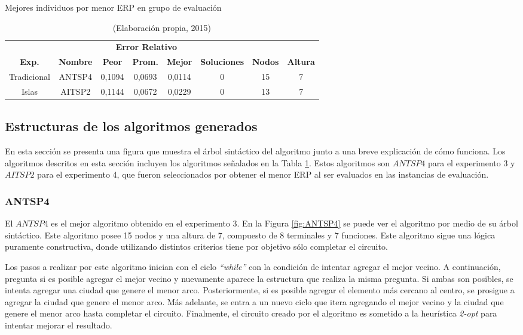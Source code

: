 \begin{table}[hbtp!]
\caption{Mejores individuos por menor ERP en grupo de evaluación}\label{tab:mejores_exp_erp_pvv}
\small
\centering
\begin{center}
\begin{tabular}{cc|ccc|ccc}
\multicolumn{2}{c}{{\textbf{ }}} & \multicolumn{3}{|c|}{{\textbf{Error Relativo}}} & \multicolumn{3}{c}{{\textbf{ }}} \\
{\textbf{Exp.}} & {\textbf{Nombre}} & {\textbf{Peor}} & {\textbf{Prom.}} & {\textbf{Mejor}} & {\textbf{Soluciones}} & {\textbf{Nodos}} & {\textbf{Altura}}\\ \hline
Tradicional & ANTSP4 & 0,1094 & 0,0693 & 0,0114 & 0 & 15 & 7 \\
Islas & AITSP2 & 0,1144 & 0,0672 & 0,0229 & 0 & 13 & 7 \\
\hline
\end{tabular}
\end{center}
\caption*{(Elaboración propia, 2015)}
\end{table}


\subsection{Estructuras de los algoritmos generados}

En esta sección se presenta una figura que muestra el árbol sintáctico del algoritmo junto a una breve explicación de cómo funciona. Los algoritmos descritos en esta sección incluyen los algoritmos señalados en la Tabla \ref{tab:mejores_exp_erp_pvv}. Estos algoritmos son $ANTSP4$ para el experimento 3 y $AITSP2$ para el experimento 4, que fueron seleccionados por obtener el menor ERP al ser evaluados en las instancias de evaluación.

\subsubsection{ANTSP4}

El $ANTSP4$ es el mejor algoritmo obtenido en el experimento 3. En la Figura \ref{fig:ANTSP4} se puede ver el algoritmo por medio de su árbol sintáctico. Este algoritmo posee 15 nodos y una altura de 7, compuesto de 8 terminales y 7 funciones. Este algoritmo sigue una lógica puramente constructiva, donde utilizando distintos criterios tiene por objetivo sólo completar el circuito.

Los pasos a realizar por este algoritmo inician con el ciclo \textit{“while”} con la condición de intentar agregar el mejor vecino. A continuación, pregunta si es posible agregar el mejor vecino y nuevamente aparece la estructura que realiza la misma pregunta. Si ambas son posibles, se intenta agregar una ciudad que genere el menor arco. Posteriormente, si es posible agregar el elemento más cercano al centro, se prosigue a agregar la ciudad que genere el menor arco. Más adelante, se entra a un nuevo ciclo que itera agregando el mejor vecino y la ciudad que genere el menor arco hasta completar el circuito. Finalmente, el circuito creado por el algoritmo es sometido a la heurística \textit{2-opt} para intentar mejorar el resultado.

